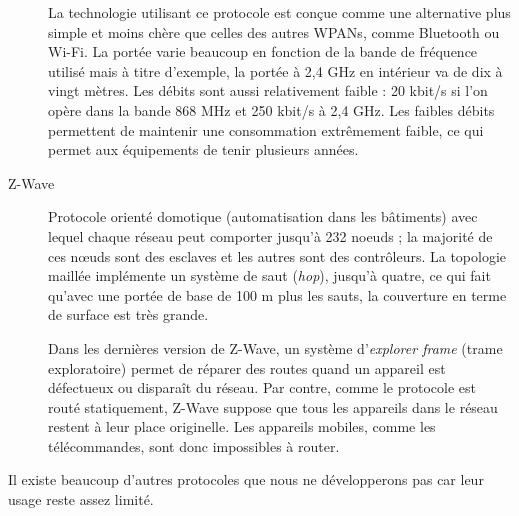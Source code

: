 \begin{description}
	La technologie utilisant ce protocole est conçue comme une alternative plus simple et moins chère que celles des autres WPANs, comme Bluetooth ou Wi-Fi. La portée varie beaucoup en fonction de la bande de fréquence utilisé mais à titre d'exemple, la portée à 2,4 GHz en intérieur va de dix à vingt mètres. Les débits sont aussi relativement faible : 20 kbit/s si l'on opère dans la bande 868 MHz et 250 kbit/s à 2,4 GHz. Les faibles débits permettent de maintenir une consommation extrêmement faible, ce qui permet aux équipements de tenir plusieurs années.	

	\item[Z-Wave]
	Protocole orienté domotique (automatisation dans les bâtiments) avec lequel chaque réseau peut comporter jusqu'à 232 noeuds ; la majorité de ces nœuds  sont des esclaves et les autres sont des contrôleurs. La topologie maillée implémente un système de saut (\textit{hop}), jusqu'à quatre, ce qui fait qu'avec une portée de base de 100 m plus les sauts, la couverture en terme de surface est très grande.

	Dans les dernières version de Z-Wave, un système d'\textit{explorer frame} (trame exploratoire) permet de réparer des routes quand un appareil est défectueux ou disparaît du réseau. Par contre, comme le protocole est routé statiquement, Z-Wave suppose que tous les appareils dans le réseau restent à leur place originelle. Les appareils mobiles, comme les télécommandes, sont donc impossibles à router.
\end{description}

Il existe beaucoup d'autres protocoles que nous ne développerons pas car leur usage reste assez limité.
